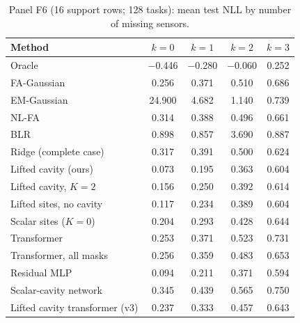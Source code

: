 \begin{table}[h]
\centering\small
\caption{\label{tab:moreF6}Panel F6 (16 support rows; 128 tasks): mean test NLL by number of missing sensors.}
\begin{tabular}{lcccc}
\toprule
Method & $k{=}0$ & $k{=}1$ & $k{=}2$ & $k{=}3$\\
\midrule
Oracle & $-$0.446 & $-$0.280 & $-$0.060 & 0.252\\
FA-Gaussian & 0.256 & 0.371 & 0.510 & 0.686\\
EM-Gaussian & 24.900 & 4.682 & 1.140 & 0.739\\
NL-FA & 0.314 & 0.388 & 0.496 & 0.661\\
BLR & 0.898 & 0.857 & 3.690 & 0.887\\
Ridge (complete case) & 0.317 & 0.391 & 0.500 & 0.624\\
Lifted cavity (ours) & 0.073 & 0.195 & 0.363 & 0.604\\
Lifted cavity, $K=2$ & 0.156 & 0.250 & 0.392 & 0.614\\
Lifted sites, no cavity & 0.117 & 0.234 & 0.389 & 0.604\\
Scalar sites ($K=0$) & 0.204 & 0.293 & 0.428 & 0.644\\
Transformer & 0.253 & 0.371 & 0.523 & 0.731\\
Transformer, all masks & 0.256 & 0.359 & 0.483 & 0.653\\
Residual MLP & 0.094 & 0.211 & 0.371 & 0.594\\
Scalar-cavity network & 0.345 & 0.439 & 0.565 & 0.750\\
Lifted cavity transformer (v3) & 0.237 & 0.333 & 0.457 & 0.643\\
\bottomrule
\end{tabular}
\end{table}


